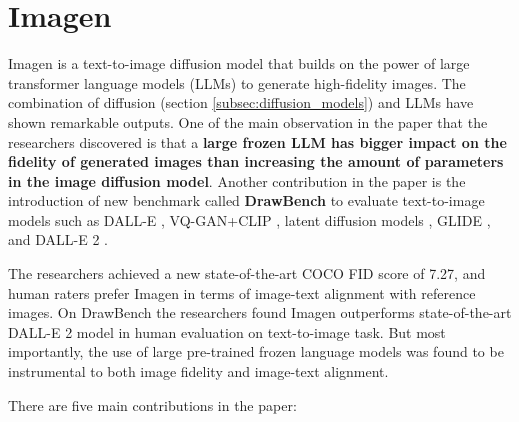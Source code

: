 \section{Imagen}

Imagen \cite{imagen} is a text-to-image diffusion model that builds on the power of large transformer language models \cite{transformer} (LLMs) to generate high-fidelity images. The combination of diffusion (section \ref{subsec:diffusion_models}) and LLMs have shown remarkable outputs. One of the main observation in the paper that the researchers discovered is that a \textbf{large frozen LLM has bigger impact on the fidelity of generated images than increasing the amount of parameters in the image diffusion model}. Another contribution in the paper is the introduction of new benchmark called \textbf{DrawBench} to evaluate text-to-image models such as DALL-E \cite{dalle}, VQ-GAN+CLIP \cite{vqgan_clip}, latent diffusion models \cite{stable_diffusion}, GLIDE \cite{glide}, and DALL-E 2 \cite{dalle_2}.

The researchers achieved a new state-of-the-art COCO FID score of 7.27, and human raters prefer Imagen in terms of image-text alignment with reference images. On DrawBench the researchers found Imagen outperforms state-of-the-art DALL-E 2 model in human evaluation on text-to-image task. But most importantly, the use of large pre-trained frozen language models was found to be instrumental to both image fidelity and image-text alignment.

There are five main contributions in the paper:

